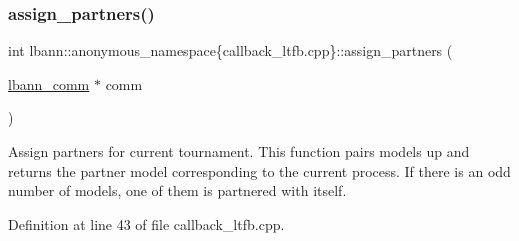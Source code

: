 \subsubsection{\texorpdfstring{assign\+\_\+partners()}{assign\_partners()}}
{\footnotesize\ttfamily int lbann\+::anonymous\+\_\+namespace\{callback\+\_\+ltfb.\+cpp\}\+::assign\+\_\+partners (\begin{DoxyParamCaption}\item[{\hyperlink{classlbann_1_1lbann__comm}{lbann\+\_\+comm} $\ast$}]{comm }\end{DoxyParamCaption})}

Assign partners for current tournament. This function pairs models up and returns the partner model corresponding to the current process. If there is an odd number of models, one of them is partnered with itself. 

Definition at line 43 of file callback\+\_\+ltfb.\+cpp.


